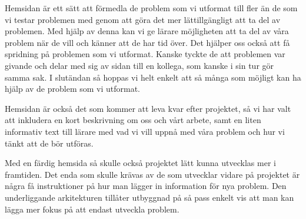 \textcolor{Mahogany}{Hemsidan är ett sätt att förmedla de problem som vi utformat till fler än de som vi testar problemen med genom att göra det mer lättillgängligt att ta del av problemen. Med hjälp av denna kan vi ge lärare möjligheten att ta del av våra problem när de vill och känner att de har tid över. Det hjälper oss också att få spridning på problemen som vi utformat. Kanske tyckte de att problemen var givande och delar med sig av sidan till en kollega, som kanske i sin tur gör samma sak. I slutändan så hoppas vi helt enkelt att så många som möjligt kan ha hjälp av de problem som vi utformat.}

\textcolor{Mahogany}{Hemsidan är också det som kommer att leva kvar efter projektet, så vi har valt att inkludera en kort beskrivning om oss och vårt arbete, samt en liten informativ text till lärare med vad vi vill uppnå med våra problem och hur vi tänkt att de bör utföras.}

\textcolor{WildStrawberry}{
    Med en färdig hemsida så skulle också projektet lätt kunna utvecklas mer i framtiden. Det enda som skulle krävas av de som utvecklar vidare på projektet är några få instruktioner på hur man lägger in information för nya problem. Den underliggande arkitekturen tillåter utbyggnad på så pass enkelt vis att man kan lägga mer fokus på att endast utveckla problem.
    }